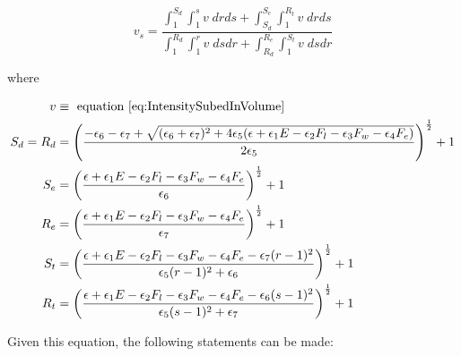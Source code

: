 \begin{minipage}{\textwidth}
	\begin{equation}
	   \label{eq:BasicSurfaceVolumeSkew}
	   v_s=\frac{
	   	\int_{1}^{S_d}\int_{1}^{s}v\;drds+
	   	\int_{S_d}^{S_e}\int_{1}^{R_t}v\;drds
	   }{
	   	\int_{1}^{R_d}\int_{1}^{r}v\;dsdr+
	   	\int_{R_d}^{R_e}\int_{1}^{S_t}v\;dsdr
	   }
	\end{equation}
	\centerline{where}
	\begin{equation*}
		\begin{split}
			v & \equiv \text{ equation \ref{eq:IntensitySubedInVolume}} \\
			S_d=R_d & =\left(
				\frac{
	   				-\epsilon_6-\epsilon_7+\sqrt{
	   					(\epsilon_6+\epsilon_7)^2+
	   					4\epsilon_5(
	   						\epsilon+
	   						\epsilon_1E-
	   						\epsilon_2F_l-
	   						\epsilon_3F_w-
	   						\epsilon_4F_e
	   					)
	   				}
	   			}{
	   				2\epsilon_5
			   	}\right)^{\frac{1}{2}} +1 \\
			S_e & =\left(
				\frac{
					\epsilon+
					\epsilon_1E-
					\epsilon_2F_l-
					\epsilon_3F_w-
					\epsilon_4F_e
				}{
					\epsilon_6
				}
			\right)^{\frac{1}{2}}+1 \\
			R_e & =\left(
				\frac{
					\epsilon+
					\epsilon_1E-
					\epsilon_2F_l-
					\epsilon_3F_w-
					\epsilon_4F_e
				}{
					\epsilon_7
				}
			\right)^{\frac{1}{2}}+1 \\
			S_t & =\left(
				\frac{
					\epsilon+
					\epsilon_1E-
					\epsilon_2F_l-
					\epsilon_3F_w-
					\epsilon_4F_e-
					\epsilon_7(r-1)^2		
				}{
					\epsilon_5(r-1)^2+
					\epsilon_6
				}
			\right)^{\frac{1}{2}}+1 \\
			R_t & =\left(
				\frac{
					\epsilon+
					\epsilon_1E-
					\epsilon_2F_l-
					\epsilon_3F_w-
					\epsilon_4F_e-
					\epsilon_6(s-1)^2		
				}{
					\epsilon_5(s-1)^2+
					\epsilon_7
				}
			\right)^{\frac{1}{2}}+1 \\
		\end{split}
	\end{equation*}
\end{minipage}

Given this equation, the following statements can be made:

